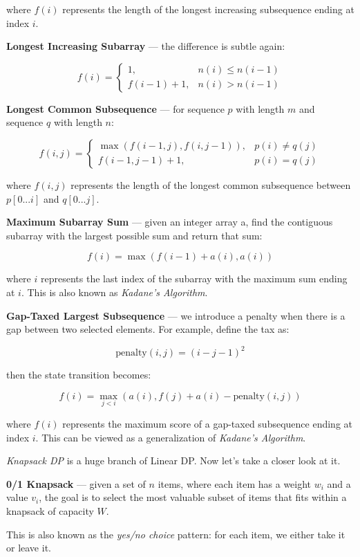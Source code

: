 \documentclass{article}
\begin{document}
where $f(i)$ represents the length of the longest increasing subsequence ending at index $i$.

\textbf{Longest Increasing Subarray} --- the difference is subtle again: 

$$
f(i)=
\begin{cases}
1, & n(i) \le n(i-1) \\
f(i-1)+1, & n(i)>n(i-1)
\end{cases}
$$

\textbf{Longest Common Subsequence} --- for sequence $p$ with length $m$ and sequence $q$ with length $n$:

$$
f(i,j)=
\begin{cases}
\max(f(i-1,j),f(i,j-1)), & p(i)\neq q(j) \\
f(i-1,j-1)+1, & p(i)=q(j)
\end{cases}
$$

where $f(i,j)$ represents the length of the longest common subsequence between $p[0...i]$ and $q[0...j]$.

\textbf{Maximum Subarray Sum} --- given an integer array a, find the contiguous subarray with the largest possible sum and return that sum:

$$
f(i)=\max(f(i-1)+a(i),a(i))
$$

where $i$ represents the last index of the subarray with the maximum sum ending at $i$. This is also known as \emph{Kadane's Algorithm}.

\textbf{Gap-Taxed Largest Subsequence} --- we introduce a penalty when there is a gap between two selected elements. For example, define the tax as:

$$
\text{penalty}(i,j)=(i-j-1)^2
$$

then the state transition becomes:

$$
f(i)=\max_{j<i}\left(a(i), f(j)+a(i)-\text{penalty}(i,j)\right)
$$

where $f(i)$ represents the maximum score of a gap-taxed subsequence ending at index $i$. This can be viewed as a generalization of \emph{Kadane's Algorithm}.

\emph{Knapsack DP} is a huge branch of Linear DP. Now let's take a closer look at it.

\textbf{0/1 Knapsack} --- given a set of $n$ items, where each item has a weight $w_i$ and a value $v_i$, the goal is to select the most valuable subset of items that fits within a knapsack of capacity $W$.

This is also known as the \emph{yes/no choice} pattern: for each item, we either take it or leave it.
\end{document}
